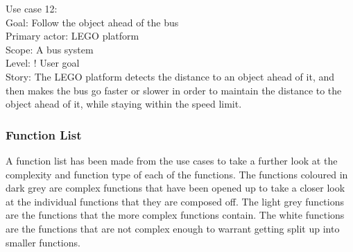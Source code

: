 Use case 12:\\
Goal: Follow the object ahead of the bus\\
Primary actor: LEGO platform\\
Scope: A bus system\\
Level: ! User goal\\
Story: The LEGO platform detects the distance to an object ahead of it, and then makes the bus go faster or slower in order to maintain the distance to the object ahead of it, while staying within the speed limit.

\subsubsection{Function List}
A function list has been made from the use cases to take a further look at the complexity and function type of each of the functions. The functions coloured in dark grey are complex functions that have been opened up to take a closer look at the individual functions that they are composed off. The light grey functions are the functions that the more complex functions contain. The white functions are the functions that are not complex enough to warrant getting split up into smaller functions.

